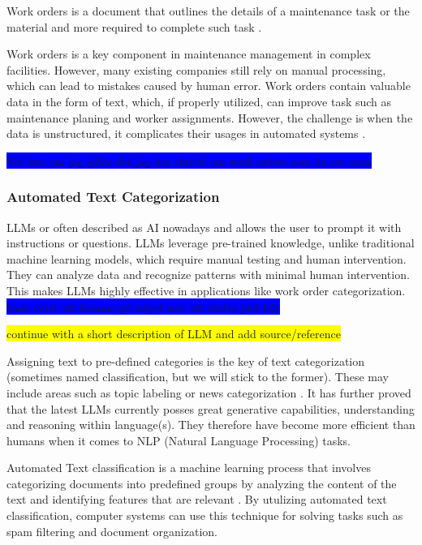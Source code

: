 \documentclass{article}
\begin{document}
Work orders is a document that outlines the details of a maintenance task or the material and more required
to complete such task \cite{ibm2023}.
\bigskip

Work orders is a key component in maintenance management in complex facilities. However, many existing companies
still rely on manual processing, which can lead to mistakes caused by human error. Work orders contain valuable
data in the form of text, which, if properly utilized, can improve task such as maintenance planing and worker assignments.
However, the challenge is when the data is unstructured, it complicates their usages in automated systems \cite{li et al.}.

\colorbox{blue}{Vet inte om jag gillar det jag har skrivit om work orders som du ser ovan}

\subsubsection{Automated Text Categorization}

LLMs or often described as AI nowadays and allows the user to prompt it with instructions or questions.
LLMs leverage pre-trained knowledge, unlike traditional machine learning models, which require
manual testing and human intervention. They can analyze data and recognize patterns with minimal
human intervention. This makes LLMs highly effective in applications like work order categorization.
\colorbox{blue}{hade svårt att komma på något mer att skriva just här}


\colorbox{yellow}{continue with a short description of LLM and add source/reference}

Assigning text to pre-defined categories is the key of text categorization
(sometimes named classification, but we will stick to the former).
These may include areas such as topic labeling or news categorization \cite{zhang2024}.
It has further proved that the latest LLMs currently posses great generative capabilities, understanding
and reasoning within language(s).
They therefore have become more efficient than humans when it comes to NLP (Natural Language Processing)
tasks.
\bigskip

Automated Text classification is a machine learning process that involves categorizing documents
into predefined groups by analyzing the content of the text and identifying features that are
relevant \cite{dalal2011}. By utulizing automated text classification, computer systems
can use this technique for solving tasks such as spam filtering and document organization.
\end{document}
